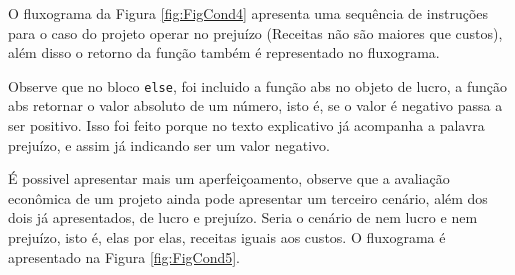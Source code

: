 \documentclass[
  11pt,
  a5paper,
  openany]{book}
\newenvironment{Shaded}{\begin{snugshade}}{\end{snugshade}}
\newcommand{\CharTok}[1]{\textcolor[rgb]{0.31,0.60,0.02}{#1}}
\newcommand{\CommentTok}[1]{\textcolor[rgb]{0.56,0.35,0.01}{\textit{#1}}}
\newcommand{\ControlFlowTok}[1]{\textcolor[rgb]{0.13,0.29,0.53}{\textbf{#1}}}
\newcommand{\DecValTok}[1]{\textcolor[rgb]{0.00,0.00,0.81}{#1}}
\newcommand{\KeywordTok}[1]{\textcolor[rgb]{0.13,0.29,0.53}{\textbf{#1}}}
\newcommand{\NormalTok}[1]{#1}
\newcommand{\OperatorTok}[1]{\textcolor[rgb]{0.81,0.36,0.00}{\textbf{#1}}}
\newcommand{\StringTok}[1]{\textcolor[rgb]{0.31,0.60,0.02}{#1}}
\begin{document}
O fluxograma da Figura \ref{fig:FigCond4} apresenta uma sequência de instruções para o caso do projeto operar no prejuízo (Receitas não são maiores que custos), além disso o retorno da função também é representado no fluxograma.

\begin{Shaded}
\end{Shaded}

Observe que no bloco \texttt{else}, foi incluido a função abs no objeto de lucro, a função abs retornar o valor absoluto de um número, isto é, se o valor é negativo passa a ser positivo. Isso foi feito porque no texto explicativo já acompanha a palavra prejuízo, e assim já indicando ser um valor negativo.

É possivel apresentar mais um aperfeiçoamento, observe que a avaliação econômica de um projeto ainda pode apresentar um terceiro cenário, além dos dois já apresentados, de lucro e prejuízo. Seria o cenário de nem lucro e nem prejuízo, isto é, elas por elas, receitas iguais aos custos. O fluxograma é apresentado na Figura \ref{fig:FigCond5}.
\end{document}
